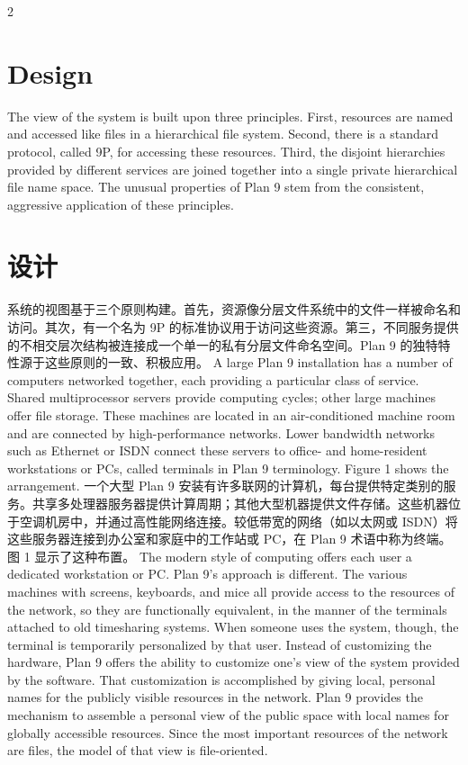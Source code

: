 \documentclass{article}
\begin{document}
\begin{paracol}{2}
\section*{Design}
The view of the system is built upon three principles. First, resources are named and accessed like files in a hierarchical file system. Second, there is a standard protocol, called 9P, for accessing these resources. Third, the disjoint hierarchies provided by different services are joined together into a single private hierarchical file name space. The unusual properties of Plan 9 stem from the consistent, aggressive application of these principles.
\switchcolumn
\section*{设计}
系统的视图基于三个原则构建。首先，资源像分层文件系统中的文件一样被命名和访问。其次，有一个名为 9P 的标准协议用于访问这些资源。第三，不同服务提供的不相交层次结构被连接成一个单一的私有分层文件命名空间。Plan 9 的独特特性源于这些原则的一致、积极应用。
\switchcolumn*
A large Plan 9 installation has a number of computers networked together, each providing a particular class of service. Shared multiprocessor servers provide computing cycles; other large machines offer file storage. These machines are located in an air-conditioned machine room and are connected by high-performance networks. Lower bandwidth networks such as Ethernet or ISDN connect these servers to office- and home-resident workstations or PCs, called terminals in Plan 9 terminology. Figure 1 shows the arrangement.
\switchcolumn
一个大型 Plan 9 安装有许多联网的计算机，每台提供特定类别的服务。共享多处理器服务器提供计算周期；其他大型机器提供文件存储。这些机器位于空调机房中，并通过高性能网络连接。较低带宽的网络（如以太网或 ISDN）将这些服务器连接到办公室和家庭中的工作站或 PC，在 Plan 9 术语中称为终端。图 1 显示了这种布置。
\switchcolumn*
The modern style of computing offers each user a dedicated workstation or PC. Plan 9's approach is different. The various machines with screens, keyboards, and mice all provide access to the resources of the network, so they are functionally equivalent, in the manner of the terminals attached to old timesharing systems. When someone uses the system, though, the terminal is temporarily personalized by that user. Instead of customizing the hardware, Plan 9 offers the ability to customize one's view of the system provided by the software. That customization is accomplished by giving local, personal names for the publicly visible resources in the network. Plan 9 provides the mechanism to assemble a personal view of the public space with local names for globally accessible resources. Since the most important resources of the network are files, the model of that view is file-oriented.

\end{paracol}
\end{document}
